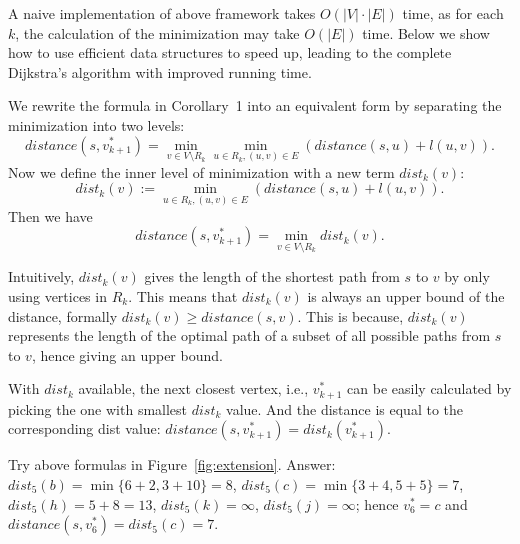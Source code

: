 \begin{minipage}{0.8\textwidth}
	\xxx
	\xxx
	\xxx
	\xxx
	\xxx
	\xxx
	\xxx
	\xxx
	\xxx
\end{minipage}

A naive implementation of above framework takes $O(|V|\cdot|E|)$ time,
as for each $k$, the calculation of the minimization may take $O(|E|)$ time.
Below we show how to use efficient data structures to speed up,
leading to the complete Dijkstra's algorithm with improved running time.


We rewrite the formula in Corollary~1 into an equivalent form by separating the minimization into two levels:
$$distance(s, v_{k+1}^*) = \textstyle \min_{v\in V\setminus R_k} \min_{u\in R_k, (u, v)\in E} (distance(s, u) + l(u,v)).$$
Now we define the inner level of minimization with a new term $dist_k(v)$:
$$dist_k(v) := \textstyle \min_{u\in R_k, (u, v)\in E} (distance(s, u) + l(u,v)).$$
Then we have 
$$distance(s, v_{k+1}^*) = \textstyle \min_{v\in V\setminus R_k} dist_k(v).$$

Intuitively, $dist_k(v)$ gives the length of the shortest path from $s$ to $v$ by only using vertices in $R_k$.
This means that $dist_k(v)$ is always an upper bound of the distance, formally $dist_k(v) \ge distance(s,v)$.
This is because, $dist_k(v)$ represents the length of the optimal
path of a subset of all possible paths from $s$ to $v$, hence giving an upper bound.

With $dist_k$ available, the next closest vertex, i.e., $v_{k+1}^*$ can be easily calculated
by picking the one with smallest $dist_k$ value. And the distance is equal to the corresponding dist value:
$distance(s, v_{k+1}^*) = dist_k(v_{k+1}^*)$.

Try above formulas in Figure~\ref{fig:extension}.
Answer: $dist_5(b) = \min\{6 + 2, 3 + 10\} = 8$, $dist_5(c) = \min\{3 + 4,  5 + 5\} = 7$, $dist_5(h) = 5 + 8 = 13$, 
$dist_5(k) = \infty$, $dist_5(j) = \infty$;
hence $v_6^* = c$ and $distance(s,v_6^*) = dist_5(c) = 7$.



